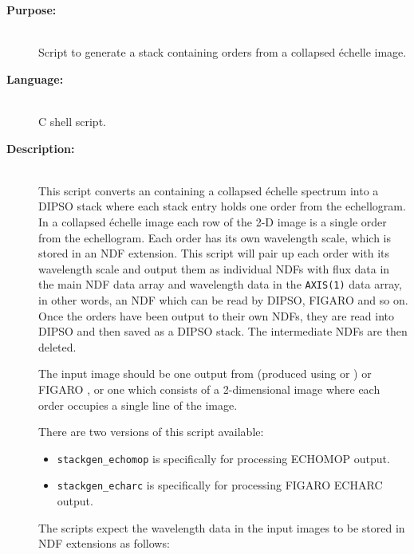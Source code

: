 \documentclass[twoside,11pt]{starlink}
\begin{document}
\begin{description}
\item [\textbf{Purpose:}] \mbox{} \\
     Script to generate a  stack containing orders
     from a collapsed \'{e}chelle image.

\item [\textbf{Language:}] \mbox{} \\
     C shell script.

\item [\textbf{Description:}] \mbox{} \\
     This script converts an 
     containing a collapsed \'{e}chelle spectrum into a DIPSO stack where each
     stack entry holds one order from the echellogram.  In a collapsed
     \'{e}chelle image each row of the 2-D image is a single order from the
     echellogram.   Each order has its own wavelength scale, which is
     stored in an NDF extension.  This script will pair up each order
     with its wavelength scale and output them as individual NDFs with
     flux data in the main NDF data array and wavelength data in the
     \verb+AXIS(1)+ data array, in other words, an NDF which can be read by
     DIPSO, FIGARO and so on.  Once the orders have been output to their
     own NDFs, they are read into DIPSO and then saved as a DIPSO stack.
     The intermediate NDFs are then deleted.

     The input image should be one output from 
     (produced using  or
     ) or FIGARO
     , or one which consists of a
     2-dimensional image where each order occupies a single line of the
     image.

     There are two versions of this script available:

\begin{itemize}

\item \verb+stackgen_echomop+ is specifically for processing ECHOMOP
      output.

\item \verb+stackgen_echarc+ is specifically for processing FIGARO ECHARC
      output.

\end{itemize}

     The scripts expect the wavelength data in the input images to be stored
     in NDF extensions as follows:


\end{description}
\end{document}

